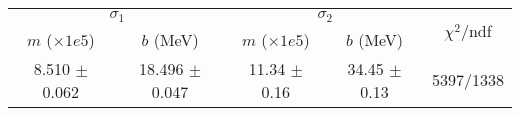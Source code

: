 \begin{tabular}{cc|cc||c}
\multicolumn{2}{c|}{$\sigma_1$} & \multicolumn{2}{|c}{$\sigma_2$} & \multirow{2}{*}{$\chi^2/$ndf} \\
$m$ ($\times1e5$) & $b$ (MeV) & $m$ ($\times1e5$) & $b$ (MeV) & \\
\hline
8.510 $\pm$ 0.062 & 18.496 $\pm$ 0.047 & 11.34 $\pm$ 0.16 & 34.45 $\pm$ 0.13 & 5397/1338\\
\end{tabular}
